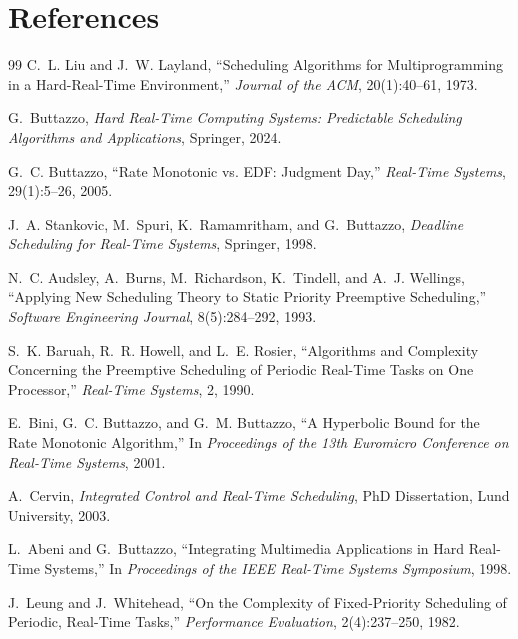 \documentclass[11pt,a4paper]{article}
\begin{document}
\section{References}
\begin{thebibliography}{99}
C.~L. Liu and J.~W. Layland,
\newblock ``Scheduling Algorithms for Multiprogramming in a Hard-Real-Time Environment,''
\newblock \emph{Journal of the ACM}, 20(1):40--61, 1973.

G.~Buttazzo,
\newblock \emph{Hard Real-Time Computing Systems: Predictable Scheduling Algorithms and Applications},
\newblock Springer, 2024.

G.~C. Buttazzo,
\newblock ``Rate Monotonic vs. EDF: Judgment Day,''
\newblock \emph{Real-Time Systems}, 29(1):5--26, 2005.

J.~A. Stankovic, M.~Spuri, K.~Ramamritham, and G.~Buttazzo,
\newblock \emph{Deadline Scheduling for Real-Time Systems},
\newblock Springer, 1998.

N.~C. Audsley, A.~Burns, M.~Richardson, K.~Tindell, and A.~J. Wellings,
\newblock ``Applying New Scheduling Theory to Static Priority Preemptive Scheduling,''
\newblock \emph{Software Engineering Journal}, 8(5):284--292, 1993.

S.~K. Baruah, R.~R. Howell, and L.~E. Rosier,
\newblock ``Algorithms and Complexity Concerning the Preemptive Scheduling of Periodic Real-Time Tasks on One Processor,''
\newblock \emph{Real-Time Systems}, 2, 1990.

E.~Bini, G.~C. Buttazzo, and G.~M. Buttazzo,
\newblock ``A Hyperbolic Bound for the Rate Monotonic Algorithm,''
\newblock In \emph{Proceedings of the 13th Euromicro Conference on Real-Time Systems}, 2001.

A.~Cervin,
\newblock \emph{Integrated Control and Real-Time Scheduling},
\newblock PhD Dissertation, Lund University, 2003.

L.~Abeni and G.~Buttazzo,
\newblock ``Integrating Multimedia Applications in Hard Real-Time Systems,''
\newblock In \emph{Proceedings of the IEEE Real-Time Systems Symposium}, 1998.

J.~Leung and J.~Whitehead,
\newblock ``On the Complexity of Fixed-Priority Scheduling of Periodic, Real-Time Tasks,''
\newblock \emph{Performance Evaluation}, 2(4):237--250, 1982.
\end{thebibliography}
\end{document}
